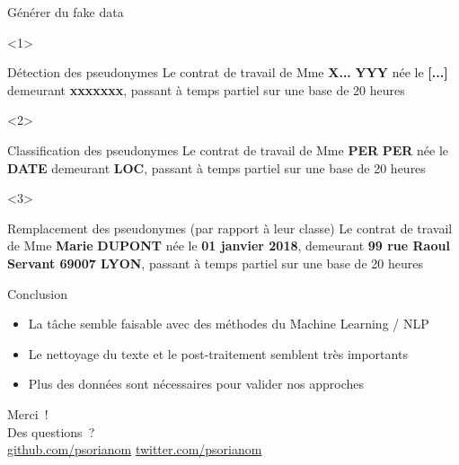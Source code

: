 \documentclass[10pt]{beamer}
\begin{document}
\begin{frame}{Générer du fake data}

\begin{onlyenv}<1>
	\begin{block}{Détection des pseudonymes}
		\vspace{1cm}
		Le contrat de travail de Mme \textbf{X...} \textbf{YYY} née le \textbf{[...]} demeurant \textbf{xxxxxxx}, passant à temps partiel
	sur une base de 20 heures 
	\end{block}
\end{onlyenv}
\begin{onlyenv}<2>
	\begin{block}{Classification des pseudonymes}
		\vspace{1cm}
		Le contrat de travail de Mme \textbf{PER} \textbf{PER} née le \textbf{DATE} demeurant \textbf{LOC}, passant à temps partiel
		sur une base de 20 heures 
	\end{block}
\end{onlyenv}

\begin{onlyenv}<3>
	\begin{block}{Remplacement des pseudonymes (par rapport à leur classe)}
		\vspace{1cm}
		Le contrat de travail de Mme \textbf{Marie} \textbf{DUPONT} née le \textbf{01 janvier 2018}, demeurant \textbf{99 rue Raoul Servant 69007 LYON}, passant à temps partiel
		sur une base de 20 heures 
	\end{block}
\end{onlyenv}


\end{frame}

\begin{frame}{Conclusion}


\begin{itemize}
	\item La tâche semble faisable avec des méthodes du Machine Learning / NLP
	\item Le nettoyage du texte et le post-traitement semblent très importants
	\item Plus des données sont nécessaires pour valider nos approches 
\end{itemize}

\end{frame}
\begin{frame}[standout]

 Merci~! \\ 
 Des questions~?\\
 
 \vspace{1cm}
 \url{github.com/psorianom}  
 \url{twitter.com/psorianom} 
\end{frame}
\end{document}
